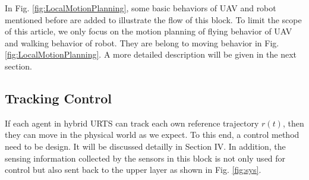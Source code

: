 \documentclass{ieeeaccess}
\begin{document}
In Fig. \ref{fig:LocalMotionPlanning}, some basic behaviors of UAV and robot mentioned before are added to illustrate the flow of this block. To limit the scope of this article, we only focus on the motion planning of flying behavior of UAV and walking behavior of robot. They are belong to moving behavior in Fig. \ref{fig:LocalMotionPlanning}. A more detailed description will be given in the next section.

\subsection{Tracking Control}
If each agent in hybrid URTS can track each own reference trajectory $r(t)$, then they can move in the physical world as we expect. To this end, a control method need to be design. It will be discussed detailly in Section IV. In addition, the sensing information collected by the sensors in this block is not only used for control but also sent back to the upper layer as shown in Fig. \ref{fig:sys}.
\end{document}
